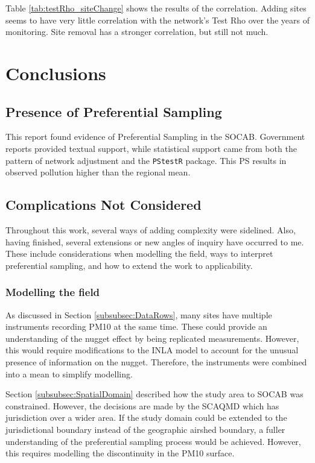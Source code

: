 \documentclass{article}
\begin{document}

Table \ref{tab:testRho_siteChange} shows the results of the correlation.  Adding sites seems to have very little correlation with the network's Test Rho over the years of monitoring.  Site removal has a stronger correlation, but still not much.


%
\section{Conclusions}\label{sec:conclusions}

\subsection{Presence of Preferential Sampling}
\label{subsec:presenceprefsamp}

This report found evidence of Preferential Sampling in the \ac{SOCAB}.  Government reports provided textual support, while statistical support came from both the pattern of network adjustment and the \texttt{PStestR} package.  This \ac{PS} results in observed pollution higher than the regional mean.


\subsection{Complications Not Considered}
\label{subsec:notconsidered}
Throughout this work, several ways of adding complexity were sidelined.  Also, having finished, several extensions or new angles of inquiry have occurred to me.  These include considerations when modelling the field, ways to interpret preferential sampling, and how to extend the work to applicability.

\subsubsection*{Modelling the field}
\label{subsubsec:modellingfield}
As discussed in Section \ref{subsubsec:DataRows}, many sites have multiple instruments recording \ac{PM10} at the same time.  These could provide an understanding of the nugget effect by being replicated measurements.  However, this would require modifications to the \ac{INLA} model to account for the unusual presence of information on the nugget.  Therefore, the instruments were combined into a mean to simplify modelling.

Section \ref{subsubsec:SpatialDomain} described how the study area to \ac{SOCAB} was constrained.  However, the decisions are made by the \ac{SCAQMD} which has jurisdiction over a wider area. If the study domain could be extended to the jurisdictional boundary instead of the geographic airshed boundary, a fuller understanding of the preferential sampling process would be achieved. However, this requires modelling the discontinuity in the \ac{PM10} surface.
\end{document}
